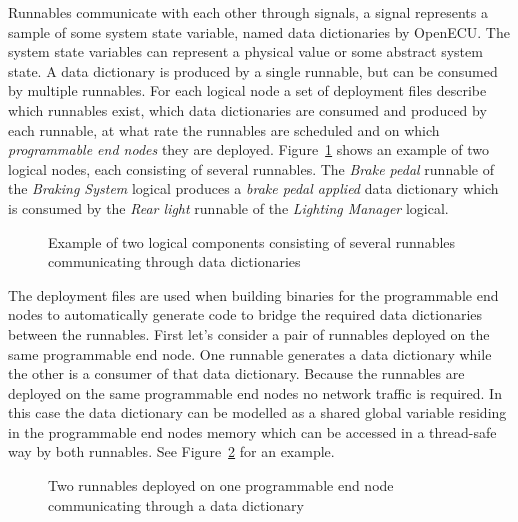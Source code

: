 Runnables communicate with each other through signals, a signal represents a sample of some system state variable, named data dictionaries by OpenECU. The system state variables can represent a physical value or some abstract system state. A data dictionary is produced by a single runnable, but can be consumed by multiple runnables. For each logical node a set of deployment files describe which runnables exist, which data dictionaries are consumed and produced by each runnable, at what rate the runnables are scheduled and on which \textit{programmable end nodes} they are deployed. Figure~\ref{fig:logical_example} shows an example of two logical nodes, each consisting of several runnables. The \textit{Brake pedal} runnable of the \textit{Braking System} logical produces a \textit{brake pedal applied} data dictionary which is consumed by the \textit{Rear light} runnable of the \textit{Lighting Manager} logical.

\begin{figure}[htb]
    \centering
 \caption{Example of two logical components consisting of several runnables communicating through data dictionaries}
\label{fig:logical_example}
\end{figure}

The deployment files are used when building binaries for the programmable end nodes to automatically generate code to bridge the required data dictionaries between the runnables. First let's consider a pair of runnables deployed on the same programmable end node. One runnable generates a data dictionary while the other is a consumer of that data dictionary. Because the runnables are deployed on the same programmable end nodes no network traffic is required. In this case the data dictionary can be modelled as a shared global variable residing in the programmable end nodes memory which can be accessed in a thread-safe way by both runnables. See Figure~\ref{fig:one_physical} for an example.
\begin{figure}[htb]
    \centering
    \caption{Two runnables deployed on one programmable end node communicating through a data dictionary}
    \label{fig:one_physical}
\end{figure}

